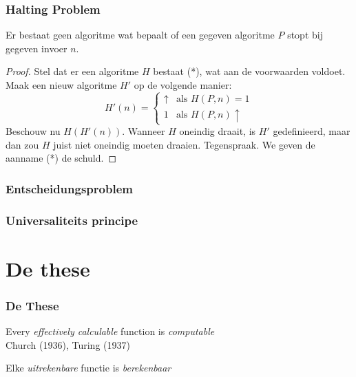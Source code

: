 \documentclass{beamer}
\begin{document}
\begin{frame}
    \frametitle{Halting Problem}

    \begin{theorem}
        Er bestaat geen algoritme wat bepaalt of een gegeven algoritme $P$ stopt bij gegeven invoer $n$.
    \end{theorem}
    \begin{proof}
        Stel dat er een algoritme $H$ bestaat (*), wat aan de voorwaarden voldoet.
        Maak een nieuw algoritme $H'$ op de volgende manier:
        \[
            H'(n) = \begin{cases}
                \uparrow & \text{als $H(P,n)=1$} \\
                1 & \text{als $H(P,n)\uparrow$}
            \end{cases}
        \]
        Beschouw nu $H(H'(n))$. Wanneer $H$ oneindig draait, is $H'$ gedefinieerd, maar dan 
        zou $H$ juist niet oneindig moeten draaien. Tegenspraak. We geven de aanname (*) de schuld.
    \end{proof}
\end{frame}

\begin{frame}{}
    \frametitle{Entscheidungsproblem}

    \vspace{1cm}
    \vspace{1cm}
\end{frame}

\begin{frame}
    \frametitle{Universaliteits principe}
\end{frame}

\section{De these}
\begin{frame}
    \frametitle{De These}
    \begin{center}
        {\Large
            Every \emph{effectively calculable} function is \emph{computable}
        }
        \\
        Church (1936), Turing (1937)

        Elke \emph{uitrekenbare} functie is \emph{berekenbaar}
    \end{center}
\end{frame}
\end{document}
